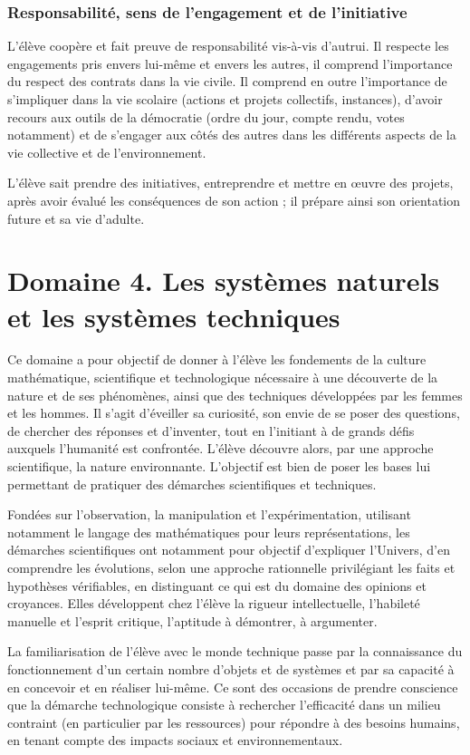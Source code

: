 \subsubsection{Responsabilité, sens de l’engagement et de l’initiative}
L’élève coopère et fait preuve de responsabilité vis-à-vis d’autrui. Il respecte les engagements pris envers lui-même et envers les autres, il comprend l’importance du respect des contrats dans la vie civile. Il comprend en outre l’importance de s’impliquer dans la vie scolaire (actions et projets collectifs, instances), d’avoir recours aux outils de la démocratie (ordre du jour, compte rendu, votes notamment) et de s’engager aux côtés des autres dans les différents aspects de la vie collective et de l’environnement.

L’élève sait prendre des initiatives, entreprendre et mettre en œuvre des projets, après avoir évalué les conséquences de son action ; il prépare ainsi son orientation future et sa vie d’adulte.

\section{Domaine 4. Les systèmes naturels et les systèmes techniques}
Ce domaine a pour objectif de donner à l’élève les fondements de la culture mathématique, scientifique et technologique nécessaire à une découverte de la nature et de ses phénomènes, ainsi que des techniques développées par les femmes et les hommes. Il s’agit d’éveiller sa curiosité, son envie de se poser des questions, de chercher des réponses et d’inventer, tout en l’initiant à de grands défis auxquels l’humanité est confrontée. L’élève découvre alors, par une approche scientifique, la nature environnante. L’objectif est bien de poser les bases lui permettant de pratiquer des démarches scientifiques et techniques.

Fondées sur l’observation, la manipulation et l’expérimentation, utilisant notamment le langage des mathématiques pour leurs représentations, les démarches scientifiques ont notamment pour objectif d’expliquer l’Univers, d’en comprendre les évolutions, selon une approche rationnelle privilégiant les faits et hypothèses vérifiables, en distinguant ce qui est du domaine des opinions et croyances. Elles développent chez l’élève la rigueur intellectuelle, l’habileté manuelle et l’esprit critique, l’aptitude à démontrer, à argumenter.

La familiarisation de l’élève avec le monde technique passe par la connaissance du fonctionnement d’un certain nombre d’objets et de systèmes et par sa capacité à en concevoir et en réaliser lui-même. Ce sont des occasions de prendre conscience que la démarche technologique consiste à rechercher l’efficacité dans un milieu contraint (en particulier par les ressources) pour répondre à des besoins humains, en tenant compte des impacts sociaux et environnementaux.


